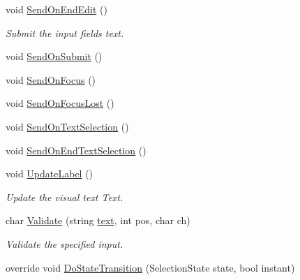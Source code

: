 \begin{DoxyCompactItemize}
\item 
void \mbox{\hyperlink{class_t_m_pro_1_1_t_m_p___input_field_adba4a85e3c7777a5573ed2ff139e4517}{Send\+On\+End\+Edit}} ()
\begin{DoxyCompactList}\small\item\em Submit the input field\textquotesingle{}s text. \end{DoxyCompactList}\item 
void \mbox{\hyperlink{class_t_m_pro_1_1_t_m_p___input_field_abf60ea8cc14546e9e0ca9f88db152b13}{Send\+On\+Submit}} ()
\item 
void \mbox{\hyperlink{class_t_m_pro_1_1_t_m_p___input_field_ac542ca4fb9d53a6a8c37b16dc07bb60a}{Send\+On\+Focus}} ()
\item 
void \mbox{\hyperlink{class_t_m_pro_1_1_t_m_p___input_field_a54f68d8730b8905a4a9a31c21c911926}{Send\+On\+Focus\+Lost}} ()
\item 
void \mbox{\hyperlink{class_t_m_pro_1_1_t_m_p___input_field_a99c2a06204ab72d3bde231e3cca78254}{Send\+On\+Text\+Selection}} ()
\item 
void \mbox{\hyperlink{class_t_m_pro_1_1_t_m_p___input_field_ac3305c44c797f1f8c62d81851e8f118c}{Send\+On\+End\+Text\+Selection}} ()
\item 
void \mbox{\hyperlink{class_t_m_pro_1_1_t_m_p___input_field_a1ac4c595e5f686b371e27745b0a2c99b}{Update\+Label}} ()
\begin{DoxyCompactList}\small\item\em Update the visual text Text. \end{DoxyCompactList}\item 
char \mbox{\hyperlink{class_t_m_pro_1_1_t_m_p___input_field_afd6552ded1ac4de1c4efd868bdc66a33}{Validate}} (string \mbox{\hyperlink{class_t_m_pro_1_1_t_m_p___input_field_ab89ad02ff00c4c076c5bd3303528e5de}{text}}, int pos, char ch)
\begin{DoxyCompactList}\small\item\em Validate the specified input. \end{DoxyCompactList}\item 
override void \mbox{\hyperlink{class_t_m_pro_1_1_t_m_p___input_field_af860afd96be9a72782c9b4c7ce91f5e6}{Do\+State\+Transition}} (Selection\+State state, bool instant)
\end{DoxyCompactItemize}

